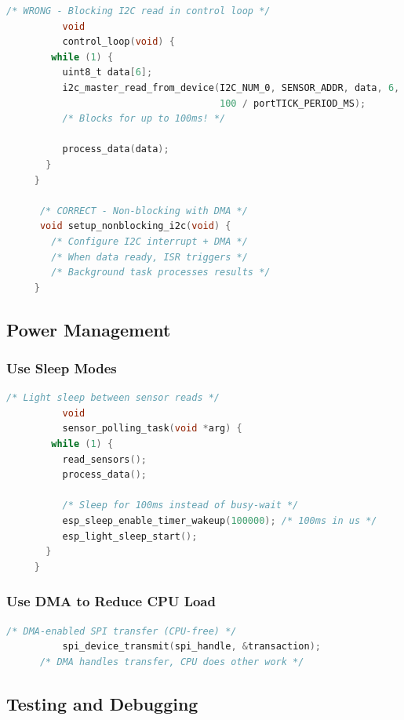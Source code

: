       \begin{lstlisting}[language = C]
          /* WRONG - Blocking I2C read in control loop */
          void
          control_loop(void) {
        while (1) {
          uint8_t data[6];
          i2c_master_read_from_device(I2C_NUM_0, SENSOR_ADDR, data, 6,
                                      100 / portTICK_PERIOD_MS);
          /* Blocks for up to 100ms! */

          process_data(data);
       }
     }

      /* CORRECT - Non-blocking with DMA */
      void setup_nonblocking_i2c(void) {
        /* Configure I2C interrupt + DMA */
        /* When data ready, ISR triggers */
        /* Background task processes results */
     }

      \end{lstlisting}
      \subsection{Power Management}

      \subsubsection{Use Sleep Modes}

      \begin{lstlisting}[language = C]
          /* Light sleep between sensor reads */
          void
          sensor_polling_task(void *arg) {
        while (1) {
          read_sensors();
          process_data();

          /* Sleep for 100ms instead of busy-wait */
          esp_sleep_enable_timer_wakeup(100000); /* 100ms in us */
          esp_light_sleep_start();
       }
     }

      \end{lstlisting}
      \subsubsection{Use DMA to Reduce CPU Load}

      \begin{lstlisting}[language = C]
          /* DMA-enabled SPI transfer (CPU-free) */
          spi_device_transmit(spi_handle, &transaction);
      /* DMA handles transfer, CPU does other work */

      \end{lstlisting}
      \subsection{Testing and Debugging}

